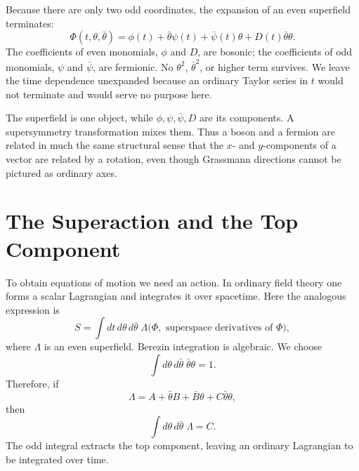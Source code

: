 Because there are only two odd coordinates, the expansion of an even superfield terminates:
\begin{equation}
\Phi(t,\theta,\bar\theta)
=\phi(t)+\bar\theta\psi(t)+\bar\psi(t)\theta
+D(t)\bar\theta\theta.
\label{eq:l7-superfield}
\end{equation}
The coefficients of even monomials, \(\phi\) and \(D\), are bosonic; the coefficients of odd monomials, \(\psi\) and \(\bar\psi\), are fermionic. No \(\theta^2\), \(\bar\theta^2\), or higher term survives. We leave the time dependence unexpanded because an ordinary Taylor series in \(t\) would not terminate and would serve no purpose here.

\begin{classroomqa}
\end{classroomqa}

The superfield is one object, while \(\phi,\psi,\bar\psi,D\) are its components. A supersymmetry transformation mixes them. Thus a boson and a fermion are related in much the same structural sense that the \(x\)- and \(y\)-components of a vector are related by a rotation, even though Grassmann directions cannot be pictured as ordinary axes.

\section{The Superaction and the Top Component}

To obtain equations of motion we need an action. In ordinary field theory one forms a scalar Lagrangian and integrates it over spacetime. Here the analogous expression is
\begin{equation}
S=\int dt\,d\theta\,d\bar\theta\;\Lambda
\bigl(\Phi,\text{ superspace derivatives of }\Phi\bigr),
\label{eq:l7-superaction}
\end{equation}
where \(\Lambda\) is an even superfield. Berezin integration is algebraic. We choose
\begin{equation}
\int d\theta\,d\bar\theta\;\bar\theta\theta=1.
\end{equation}
Therefore, if
\begin{equation}
\Lambda=A+\bar\theta B+\bar B\theta+C\bar\theta\theta,
\end{equation}
then
\begin{equation}
\int d\theta\,d\bar\theta\;\Lambda=C.
\label{eq:l7-top-component}
\end{equation}
The odd integral extracts the top component, leaving an ordinary Lagrangian to be integrated over time.

